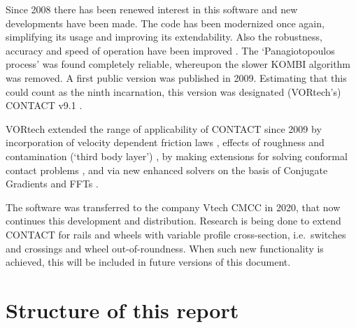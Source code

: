 \documentclass[12pt]{report}
\begin{document}
Since 2008 there has been renewed interest in this software and new
developments have been made. The code has been modernized once again,
simplifying its usage and improving its extendability. Also the robustness,
accuracy and speed of operation have been improved
\cite{Vollebregt2009a-cm2009}. The `Panagiotopoulos process' was found
completely reliable, whereupon the slower KOMBI algorithm was removed. A
first public version was published in 2009. Estimating that this could count
as the ninth incarnation, this version was designated (VORtech's) CONTACT
v9.1 \cite{Vollebregt2009b-userguide-v9}.

VORtech extended the range of applicability of CONTACT since 2009 by
incorporation of velocity dependent friction laws
\cite{Vollebregt2014c-tractcurv,Vollebregt2012a-quasistd}, effects of
roughness and contamination (`third body layer') 
\cite{Vollebregt2014c-tractcurv,Vollebregt2021a-soa-paper,
Vollebregt2019a-fra}, by making extensions for solving conformal
contact problems \cite{Vollebregt2018b-corrigendum,
Vollebregt2020c-distr-force,Vollebregt2014d-conformal}, and via new
enhanced solvers on the basis of Conjugate Gradients and FFTs 
\cite{Vollebregt2014a-fftprec,Zhao_Jing2015a-tangcg}. 

The software was transferred to the company Vtech CMCC in 2020, that now
continues this development and distribution. Research is being done to
extend CONTACT for rails and wheels with variable profile cross-section,
i.e.\ switches and crossings \cite{Vollebregt2023a-iavsd2023} and wheel
out-of-roundness. When such new functionality is achieved, this will be
included in future versions of this document.

\section{Structure of this report}
\end{document}
